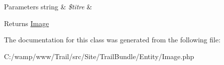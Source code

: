 \begin{DoxyParams}[1]{Parameters}
string & {\em \$titre} & \\
\hline
\end{DoxyParams}
\begin{DoxyReturn}{Returns}
\hyperlink{class_site_1_1_trail_bundle_1_1_entity_1_1_image}{Image} 
\end{DoxyReturn}


The documentation for this class was generated from the following file\+:\begin{DoxyCompactItemize}
\item 
C\+:/wamp/www/\+Trail/src/\+Site/\+Trail\+Bundle/\+Entity/Image.\+php\end{DoxyCompactItemize}
